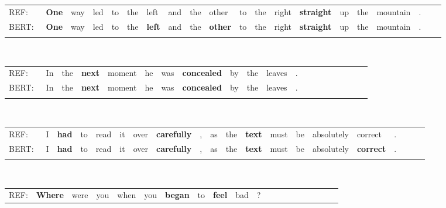 \documentclass[11pt]{article}
\begin{document}
\begin{table*}[h!]

\begingroup
\setlength{\tabcolsep}{0.2\tabcolsep}\noindent\begin{tabular}{*{20}{l}}\\
REF: &  \textbf{One} & way & {\tiny led} & {\tiny to} & {\tiny the} & left & {\tiny and} & {\tiny the} & {\tiny other} & {\tiny to} & {\tiny the} & right & \textbf{straight} & {\tiny up} & {\tiny the} & mountain & . &  \\
BERT:\quad~ &  \textbf{One} & {\tiny way} & led & {\tiny to} & {\tiny the} & \textbf{left} & {\tiny and} & {\tiny the} & \textbf{other} & {\tiny to} & {\tiny the} & right & \textbf{straight} & {\tiny up} & {\tiny the} & mountain & . &  \\
\vspace{-8.5mm}
\end{tabular}
\\
\noindent\begin{tabular}{*{20}{l}}\\
REF: &  In & {\tiny the} & \textbf{next} & moment & {\tiny he} & {\tiny was} & \textbf{concealed} & {\tiny by} & {\tiny the} & leaves & . &  \\
BERT:\quad~ &  {\tiny In} & {\tiny the} & \textbf{next} & moment & {\tiny he} & {\tiny was} & \textbf{concealed} & {\tiny by} & {\tiny the} & leaves & . &  \\
\vspace{-8.5mm}
\end{tabular}
\\
\noindent\begin{tabular}{*{20}{l}}\\
REF: &  {\tiny I} & \textbf{had} & {\tiny to} & {\tiny read} & {\tiny it} & {\tiny over} & \textbf{carefully} & , & {\tiny as} & {\tiny the} & \textbf{text} & {\tiny must} & {\tiny be} & {\tiny absolutely} & correct & . &  \\
BERT:\quad~ &  {\tiny I} & \textbf{had} & {\tiny to} & read & {\tiny it} & over & \textbf{carefully} & , & as & {\tiny the} & \textbf{text} & must & {\tiny be} & absolutely & \textbf{correct} & . &  \\
\vspace{-8.5mm}
\end{tabular}
\\
\noindent\begin{tabular}{*{20}{l}}\\
REF: &  \textbf{Where} & were & {\tiny you} & {\tiny when} & {\tiny you} & \textbf{began} & {\tiny to} & \textbf{feel} & bad & ? &  \\

\end{tabular}
\end{table*}
\end{document}
